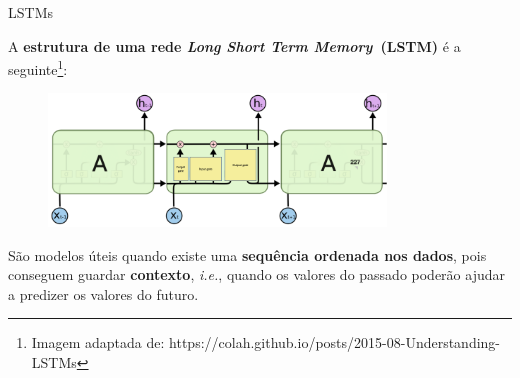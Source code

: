 \begin{frame}{LSTMs}

A \textbf{estrutura de uma rede \textit{Long Short Term Memory}~(LSTM)} é a seguinte\footnote{\tiny{Imagem adaptada de: https://colah.github.io/posts/2015-08-Understanding-LSTMs}}:

\begin{figure}
    \centering
    \includegraphics[width=0.8\textwidth]{img/LSTM.png}
\end{figure}

\pause

São modelos úteis quando existe uma \textbf{sequência ordenada nos dados}, pois conseguem guardar \textbf{contexto}, \textit{i.e.}, quando os valores do passado poderão ajudar a predizer os valores do futuro.


\end{frame}

